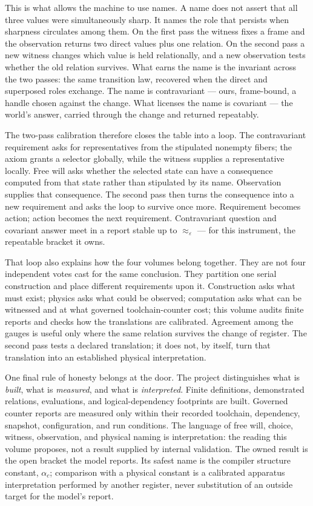 \documentclass[12pt,oneside]{book}
\begin{document}
This is what allows the machine to use names. A name does not assert that all three values were simultaneously sharp.
It names the role that persists when sharpness circulates among them. On the first pass the witness fixes a frame and
the observation returns two direct values plus one relation. On the second pass a new witness changes which value is
held relationally, and a new observation tests whether the old relation survives. What earns the name is the invariant
across the two passes: the same transition law, recovered when the direct and superposed roles exchange. The name is
contravariant --- ours, frame-bound, a handle chosen against the change. What licenses the name is covariant --- the
world's answer, carried through the change and returned repeatably.

The two-pass calibration therefore closes the table into a loop. The contravariant requirement asks for representatives
from the stipulated nonempty fibers; the axiom grants a selector globally, while the witness supplies a representative
locally. Free will asks whether the selected state can have a consequence computed from that state rather than
stipulated by its name. Observation supplies that consequence. The second pass then turns the consequence into a new
requirement and asks the loop to survive once more. Requirement becomes action; action becomes the next requirement.
Contravariant question and covariant answer meet in a report stable up to \(\approx_{\varepsilon}\) --- for this
instrument, the repeatable bracket it owns.

That loop also explains how the four volumes belong together. They are not four independent votes cast for the same
conclusion. They partition one serial construction and place different requirements upon it. Construction asks what
must exist; physics asks what could be observed; computation asks what can be witnessed and at what governed
toolchain-counter cost; this volume audits finite reports and checks how the translations are calibrated. Agreement among the gauges is useful only where
the same relation survives the change of register. The second pass tests a declared translation; it does not, by itself,
turn that translation into an established physical interpretation.

One final rule of honesty belongs at the door. The project distinguishes what is \emph{built}, what is
\emph{measured}, and what is \emph{interpreted}. Finite definitions, demonstrated relations, evaluations, and
logical-dependency footprints are built. Governed counter reports are measured only within their recorded toolchain,
dependency, snapshot, configuration, and run conditions. The language of free will, choice, witness, observation, and
physical naming is interpretation: the reading this volume proposes, not a result supplied by internal validation.
The owned result is the open bracket the model reports. Its safest name is the compiler structure constant,
\(\alpha_c\); comparison with a physical constant is a calibrated apparatus interpretation performed by another
register, never substitution of an outside target for the model's report.
\end{document}
